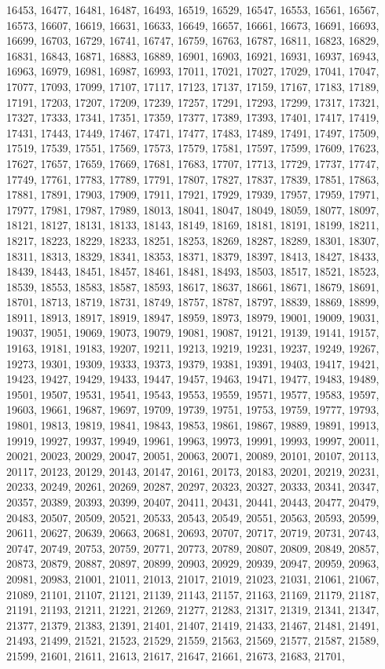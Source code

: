 \documentclass[10pt,twocolumn]{article}
\begin{document}
\begin{thebibliography}{9}
16453, 16477, 16481, 16487, 16493, 16519, 16529, 16547, 16553, 16561, 16567, 16573, 16607, 16619, 16631, 16633, 16649, 16657, 16661, 16673, 16691, 16693, 16699, 16703, 16729, 16741, 16747, 16759, 16763, 16787, 16811, 16823, 16829, 16831, 16843, 16871, 16883, 16889, 16901, 16903, 16921, 16931, 16937, 16943, 16963, 16979, 16981, 16987, 16993, 17011, 17021, 17027, 17029, 17041, 17047, 17077, 17093, 17099, 17107, 17117, 17123, 17137, 17159, 17167, 17183, 17189, 17191, 17203, 17207, 17209, 17239, 17257, 17291, 17293, 17299, 17317, 17321, 17327, 17333, 17341, 17351, 17359, 17377, 17389, 17393, 17401, 17417, 17419, 17431, 17443, 17449, 17467, 17471, 17477, 17483, 17489, 17491, 17497, 17509, 17519, 17539, 17551, 17569, 17573, 17579, 17581, 17597, 17599, 17609, 17623, 17627, 17657, 17659, 17669, 17681, 17683, 17707, 17713, 17729, 17737, 17747, 17749, 17761, 17783, 17789, 17791, 17807, 17827, 17837, 17839, 17851, 17863, 17881, 17891, 17903, 17909, 17911, 17921, 17929, 17939, 17957, 17959, 17971, 17977, 17981, 17987, 17989, 18013, 18041, 18047, 18049, 18059, 18077, 18097, 18121, 18127, 18131, 18133, 18143, 18149, 18169, 18181, 18191, 18199, 18211, 18217, 18223, 18229, 18233, 18251, 18253, 18269, 18287, 18289, 18301, 18307, 18311, 18313, 18329, 18341, 18353, 18371, 18379, 18397, 18413, 18427, 18433, 18439, 18443, 18451, 18457, 18461, 18481, 18493, 18503, 18517, 18521, 18523, 18539, 18553, 18583, 18587, 18593, 18617, 18637, 18661, 18671, 18679, 18691, 18701, 18713, 18719, 18731, 18749, 18757, 18787, 18797, 18839, 18869, 18899, 18911, 18913, 18917, 18919, 18947, 18959, 18973, 18979, 19001, 19009, 19031, 19037, 19051, 19069, 19073, 19079, 19081, 19087, 19121, 19139, 19141, 19157, 19163, 19181, 19183, 19207, 19211, 19213, 19219, 19231, 19237, 19249, 19267, 19273, 19301, 19309, 19333, 19373, 19379, 19381, 19391, 19403, 19417, 19421, 19423, 19427, 19429, 19433, 19447, 19457, 19463, 19471, 19477, 19483, 19489, 19501, 19507, 19531, 19541, 19543, 19553, 19559, 19571, 19577, 19583, 19597, 19603, 19661, 19687, 19697, 19709, 19739, 19751, 19753, 19759, 19777, 19793, 19801, 19813, 19819, 19841, 19843, 19853, 19861, 19867, 19889, 19891, 19913, 19919, 19927, 19937, 19949, 19961, 19963, 19973, 19991, 19993, 19997, 20011, 20021, 20023, 20029, 20047, 20051, 20063, 20071, 20089, 20101, 20107, 20113, 20117, 20123, 20129, 20143, 20147, 20161, 20173, 20183, 20201, 20219, 20231, 20233, 20249, 20261, 20269, 20287, 20297, 20323, 20327, 20333, 20341, 20347, 20357, 20389, 20393, 20399, 20407, 20411, 20431, 20441, 20443, 20477, 20479, 20483, 20507, 20509, 20521, 20533, 20543, 20549, 20551, 20563, 20593, 20599, 20611, 20627, 20639, 20663, 20681, 20693, 20707, 20717, 20719, 20731, 20743, 20747, 20749, 20753, 20759, 20771, 20773, 20789, 20807, 20809, 20849, 20857, 20873, 20879, 20887, 20897, 20899, 20903, 20929, 20939, 20947, 20959, 20963, 20981, 20983, 21001, 21011, 21013, 21017, 21019, 21023, 21031, 21061, 21067, 21089, 21101, 21107, 21121, 21139, 21143, 21157, 21163, 21169, 21179, 21187, 21191, 21193, 21211, 21221, 21269, 21277, 21283, 21317, 21319, 21341, 21347, 21377, 21379, 21383, 21391, 21401, 21407, 21419, 21433, 21467, 21481, 21491, 21493, 21499, 21521, 21523, 21529, 21559, 21563, 21569, 21577, 21587, 21589, 21599, 21601, 21611, 21613, 21617, 21647, 21661, 21673, 21683, 21701, 
\end{thebibliography}
\end{document}
